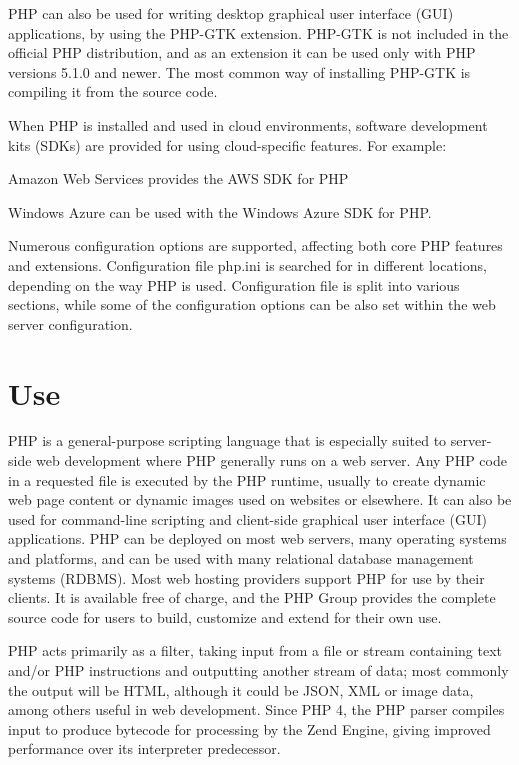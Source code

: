 PHP can also be used for writing desktop graphical user interface (GUI) applications, by using the PHP-GTK extension. PHP-GTK is not included in the official PHP distribution, and as an extension it can be used only with PHP versions 5.1.0 and newer. The most common way of installing PHP-GTK is compiling it from the source code.


When PHP is installed and used in cloud environments, software development kits (SDKs) are provided for using cloud-specific features. For example:


\begin{compactitem}
\item Amazon Web Services provides the AWS SDK for PHP
\item Windows Azure can be used with the Windows Azure SDK for PHP.
\end{compactitem}

Numerous configuration options are supported, affecting both core PHP features and extensions. Configuration file php.ini is searched for in different locations, depending on the way PHP is used. Configuration file is split into various sections, while some of the configuration options can be also set within the web server configuration.





\chapter{Use}


PHP is a general-purpose scripting language that is especially suited to server-side web development where PHP generally runs on a web server. Any PHP code in a requested file is executed by the PHP runtime, usually to create dynamic web page content or dynamic images used on websites or elsewhere. It can also be used for command-line scripting and client-side graphical user interface (GUI) applications. PHP can be deployed on most web servers, many operating systems and platforms, and can be used with many relational database management systems (RDBMS). Most web hosting providers support PHP for use by their clients. It is available free of charge, and the PHP Group provides the complete source code for users to build, customize and extend for their own use.


PHP acts primarily as a filter, taking input from a file or stream containing text and/or PHP instructions and outputting another stream of data; most commonly the output will be HTML, although it could be JSON, XML or image data, among others useful in web development. Since PHP 4, the PHP parser compiles input to produce bytecode for processing by the Zend Engine, giving improved performance over its interpreter predecessor.

